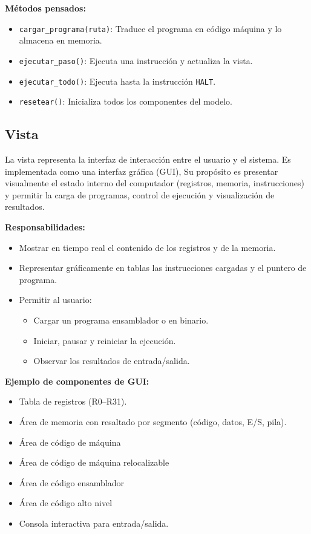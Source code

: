 \documentclass{article}
\begin{document}
\textbf{Métodos pensados:}
\begin{itemize}
  \item \texttt{cargar\_programa(ruta)}: Traduce el programa en código máquina y lo 
      almacena en memoria.
  \item \texttt{ejecutar\_paso()}: Ejecuta una instrucción y actualiza la vista.
  \item \texttt{ejecutar\_todo()}: Ejecuta hasta la instrucción \texttt{HALT}.
  \item \texttt{resetear()}: Inicializa todos los componentes del modelo.
\end{itemize}


\subsection{Vista}

La vista representa la interfaz de interacción entre el usuario y el sistema. 
Es implementada como una interfaz gráfica (GUI),
Su propósito es presentar visualmente el estado interno 
del computador (registros, memoria, instrucciones) y permitir la carga de programas, 
control de ejecución y visualización de resultados.

\textbf{Responsabilidades:}
\begin{itemize}
  \item Mostrar en tiempo real el contenido de los registros y de la memoria.
  \item Representar gráficamente en tablas las instrucciones cargadas y el puntero de programa.
  \item Permitir al usuario:
    \begin{itemize}
      \item Cargar un programa ensamblador o en binario.
      \item Iniciar, pausar y reiniciar la ejecución.
      \item Observar los resultados de entrada/salida.
    \end{itemize}
\end{itemize}

\textbf{Ejemplo de componentes de GUI:}
\begin{itemize}
  \item Tabla de registros (R0–R31).
  \item Área de memoria con resaltado por segmento (código, datos, E/S, pila).
  \item Área de código de máquina 
  \item Área de código de máquina relocalizable
  \item Área de código ensamblador
  \item Área de código alto nivel
  \item Consola interactiva para entrada/salida.
\end{itemize}
\end{document}
